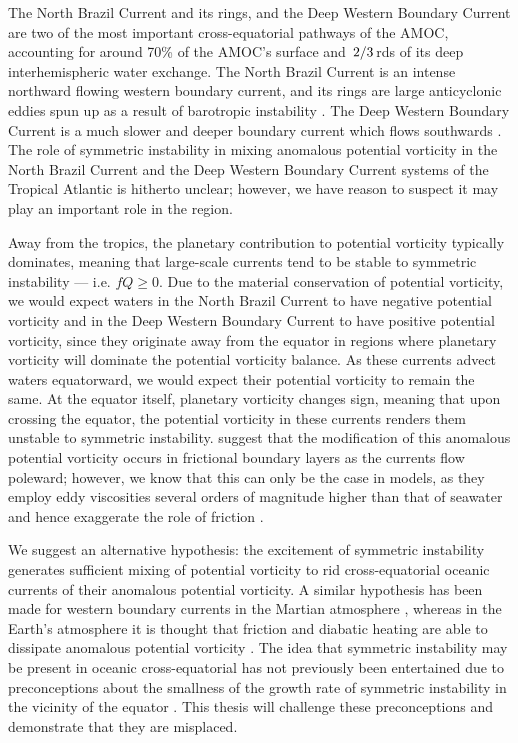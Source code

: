 
The North Brazil Current and its rings, and the Deep Western Boundary Current are two of the most important cross-equatorial pathways of the AMOC, accounting for around 70\% of the AMOC's surface \citep{Fratantoni2000} and $\flatfrac{2}{3}$rds of its deep \citep{Richardson1999, Bower2019} interhemispheric water exchange. The North Brazil Current is an intense northward flowing western boundary current, and its rings are large anticyclonic eddies spun up as a result of barotropic instability \citep{Johns1998,Castelao2011}. The Deep Western Boundary Current is a much slower and deeper boundary current which flows southwards \citep{Schott2005}. The role of symmetric instability in mixing anomalous potential vorticity in the North Brazil Current and the Deep Western Boundary Current systems of the Tropical Atlantic is hitherto unclear; however, we have reason to suspect it may play an important role in the region. 

Away from the tropics, the planetary contribution to potential vorticity typically dominates, meaning that large-scale currents tend to be stable to symmetric instability --- i.e. $fQ \geq 0$. Due to the material conservation of potential vorticity, we would expect waters in the North Brazil Current to have negative potential vorticity and in the Deep Western Boundary Current to have positive potential vorticity, since they originate away from the equator in regions where planetary vorticity will dominate the potential vorticity balance. As these currents advect waters equatorward, we would expect their potential vorticity to remain the same. At the equator itself, planetary vorticity changes sign, meaning that upon crossing the equator, the potential vorticity in these currents renders them unstable to symmetric instability. \citet{Edwards1998I, Edwards1998II} suggest that the modification of this anomalous potential vorticity occurs in frictional boundary layers as the currents flow poleward; however, we know that this can only be the case in models, as they employ eddy viscosities several orders of magnitude higher than that of seawater and hence exaggerate the role of friction \citep{Akuetevi2015}.

We suggest an alternative hypothesis: the excitement of symmetric instability generates sufficient mixing of potential vorticity to rid cross-equatorial oceanic currents of their anomalous potential vorticity. A similar hypothesis has been made for western boundary currents in the Martian atmosphere \citep{Joshi1994}, whereas in the Earth's atmosphere it is thought that friction and diabatic heating are able to dissipate anomalous potential vorticity \citep{Rodwell1995}. The idea that symmetric instability may be present in oceanic cross-equatorial has not previously been entertained due to preconceptions about the smallness of the growth rate of symmetric instability in the vicinity of the equator \citep{Edwards1998I, Haine1998}. This thesis will challenge these preconceptions and demonstrate that they are misplaced.


